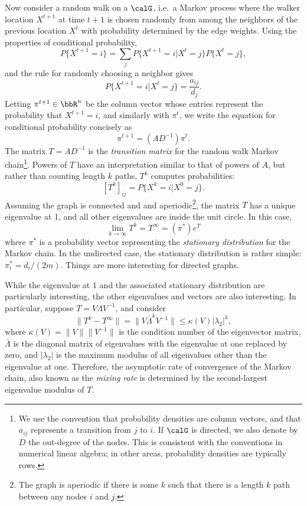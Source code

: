 \documentclass[12pt, leqno]{article} %
\begin{document}
Now consider a random walk on a $\calG$, i.e.~a Markov
process where the walker location $X^{t+1}$ at time $t+1$ is chosen
randomly from among the neighbors of the previous location $X^t$ with
probability determined by the edge weights.  Using the properties of
conditional probability,
\[
  P\{X^{t+1} = i\} = \sum_j P\{X^{t+1} = i | X^t = j\} P\{X^t = j\},
\]
and the rule for randomly choosing a neighbor gives
\[
  P\{X^{t+1} = i | X^t = j\} = \frac{a_{ij}}{d_j}.
\]
Letting $\pi^{t+1} \in \bbR^n$ be the column vector whose entries represent the
probability that $X^{t+1} = i$, and similarly with $\pi^t$,
we write the equation for conditional probability concisely as
\[
  \pi^{t+1} = (AD^{-1}) \pi^t.
\]
The matrix $T = AD^{-1}$ is the {\em transition matrix} for the random walk
Markov chain\footnote{%
  We use the convention that probability densities are column
  vectors, and that $a_{ij}$ represents a transition from $j$ to $i$.
  If $\calG$ is directed, we also denote by $D$ the out-degree of the nodes.
  This is consistent with the conventions in numerical linear algebra;
  in other areas, probability densities are typically rows.
}.
Powers of $T$ have an interpretation similar to that of powers of $A$,
but rather than counting length $k$ paths, $T^k$ computes
probabilities:
\[
  [T^k]_{ij} = P\{ X^{k} = i | X^{0} = j \}.
\]
Assuming the graph is connected and and aperiodic\footnote{%
  The graph is aperiodic if there is some $k$ such that there is a
  length $k$ path between any nodes $i$ and $j$.
},
the matrix $T$ has a unique eigenvalue at 1, and all other eigenvalues
are inside the unit circle.  In this case,
\[
  \lim_{k \rightarrow \infty} T^k = T^{\infty} = (\pi^*) e^T
\]
where $\pi^*$ is a probability vector representing the
{\em stationary distribution} for the Markov chain.  In the undirected
case, the stationary distribution is rather simple: $\pi^*_i =
d_i/(2m)$.  Things are more interesting for directed graphs.

While the eigenvalue at $1$ and the associated stationary distribution
are particularly interesting, the other eigenvalues and vectors are
also interesting.  In particular, suppose $T = V \Lambda V^{-1}$,
and consider
\[
  \|T^k-T^\infty\| = \|V \bar{\Lambda}^k V^{-1} \| \leq \kappa(V) |\lambda_2|^k,
\]
where $\kappa(V) = \|V\| \|V^{-1}\|$ is the condition number of the
eigenvector matrix, $\bar{\Lambda}$ is the diagonal matrix of
eigenvalues with the eigenvalue at one replaced by zero, and $|\lambda_2|$
is the maximum modulus of all eigenvalues other than the eigenvalue at one.
Therefore, the asymptotic rate of convergence of the Markov chain,
also known as the {\em mixing rate} is determined by the
second-largest eigenvalue modulus of $T$.
\end{document}
